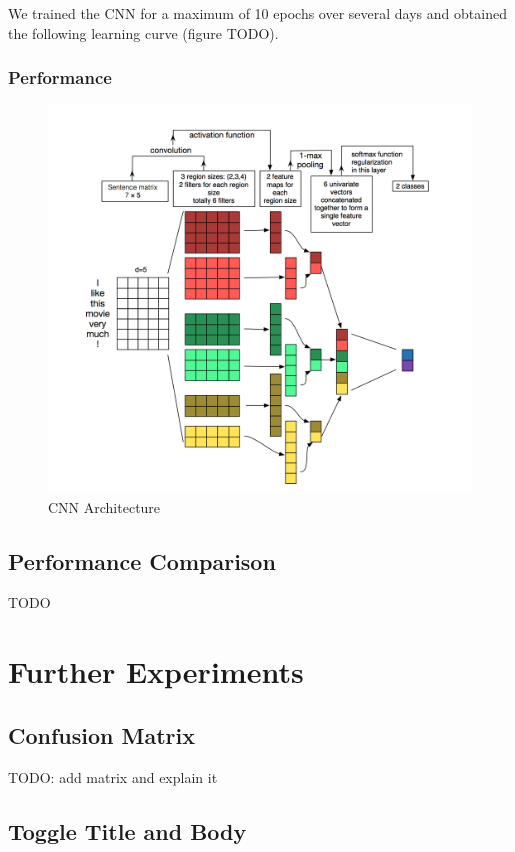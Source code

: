 \documentclass{sig-alternate-05-2015}
\begin{document}
We trained the CNN for a maximum of 10 epochs over several days and obtained the following learning curve (figure TODO).

\subsubsection{Performance}
\begin{figure}[H]
\centering
\includegraphics[width=\linewidth]{plots/multi-channel-CNN-architecture.png}
\caption{CNN Architecture}
\end{figure}

\subsection{Performance Comparison}
TODO

\section{Further Experiments}
\subsection{Confusion Matrix}
TODO: add matrix and explain it

\subsection{Toggle Title and Body}
\end{document}
